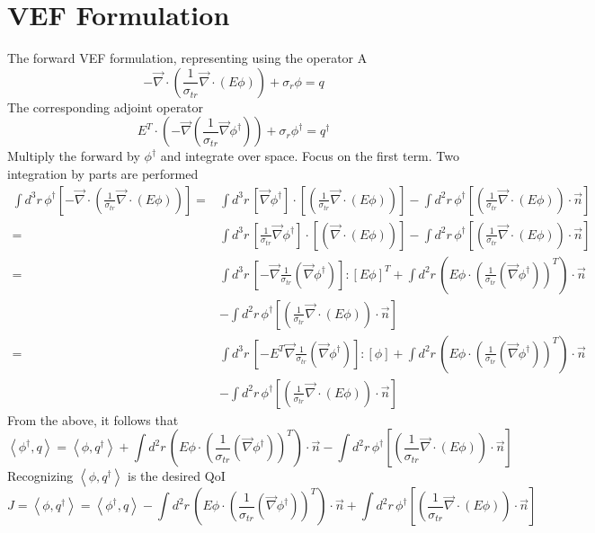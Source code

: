 \documentclass{article}
\newcommand{\bra}{\left\langle}
\newcommand{\ket}{\right\rangle}
\newcommand{\vdiv}{\vec{\nabla} \cdot}
\newcommand{\vgrad}{\vec{\nabla}}
\begin{document}
\section{VEF Formulation}
The forward VEF formulation, representing using the operator A
\[ -\vdiv \left( \frac{1}{\sigma_{tr}} \vdiv \left( E \phi \right) \right)
+ \sigma_r \phi
= q
\]
The corresponding adjoint operator
\[ E^T \cdot \left( - \vgrad \left( \frac{1}{\sigma_{tr}} \vgrad \phi^\dag \right) \right)
+ \sigma_r \phi^\dag
= q^\dag
\]
Multiply the forward by $\phi^\dag$ and integrate over space. Focus on the first term. Two integration by parts are performed
\begin{align*}
\int d^3r \, \phi^\dag \left[  -\vdiv \left( \frac{1}{\sigma_{tr}} \vdiv \left( E \phi \right) \right) \right] 
=& \int d^3r \, \left[ \vgrad \phi^\dag \right] \cdot \left[ \left( \frac{1}{\sigma_{tr}} \vdiv \left( E \phi \right) \right) \right] 
- \int d^2 r \, \phi^\dag \left[ \left( \frac{1}{\sigma_{tr}} \vdiv \left( E \phi \right) \right) \cdot \vec{n} \right] \\
=& \int d^3r \, \left[ \frac{1}{\sigma_{tr}} \vgrad \phi^\dag \right] \cdot \left[ \left(  \vdiv \left( E \phi \right) \right) \right] 
- \int d^2 r \, \phi^\dag \left[ \left( \frac{1}{\sigma_{tr}} \vdiv \left( E \phi \right) \right) \cdot \vec{n} \right] \\
=& \int d^3r \, \left[- \vgrad \frac{1}{ \sigma_{tr}} \left(  \vgrad \phi^\dag \right) \right] : \left[ E \phi \right]^T 
+ \int d^2 r \, \left( E \phi \cdot \left( \frac{1}{ \sigma_{tr}} \left(  \vgrad \phi^\dag \right) \right)^T \right) \cdot \vec{n} \\
&- \int d^2 r \, \phi^\dag \left[ \left( \frac{1}{\sigma_{tr}} \vdiv \left( E \phi \right) \right) \cdot \vec{n} \right]\\
=& \int d^3r \, \left[- E^T \vgrad \frac{1}{ \sigma_{tr}} \left(  \vgrad \phi^\dag \right) \right] : \left[ \phi \right] 
+ \int d^2 r \, \left( E \phi \cdot \left( \frac{1}{ \sigma_{tr}} \left(  \vgrad \phi^\dag \right) \right)^T \right) \cdot \vec{n} \\
&- \int d^2 r \, \phi^\dag \left[ \left( \frac{1}{\sigma_{tr}} \vdiv \left( E \phi \right) \right) \cdot \vec{n} \right]
\end{align*}
From the above, it follows that
\[
\bra \phi^\dag , q \ket = \bra \phi, q^\dag \ket + \int d^2 r \, \left( E \phi \cdot \left( \frac{1}{ \sigma_{tr}} \left(  \vgrad \phi^\dag \right) \right)^T \right) \cdot \vec{n} - \int d^2 r \, \phi^\dag \left[ \left( \frac{1}{\sigma_{tr}} \vdiv \left( E \phi \right) \right) \cdot \vec{n} \right]
\]
Recognizing $\bra \phi, q^\dag \ket $ is the desired QoI
\[
J = \bra \phi, q^\dag \ket = \bra \phi^\dag , q \ket - \int d^2 r \, \left( E \phi \cdot \left( \frac{1}{ \sigma_{tr}} \left(  \vgrad \phi^\dag \right) \right)^T \right) \cdot \vec{n} + \int d^2 r \, \phi^\dag \left[ \left( \frac{1}{\sigma_{tr}} \vdiv \left( E \phi \right) \right) \cdot \vec{n} \right]
\]
\end{document}
